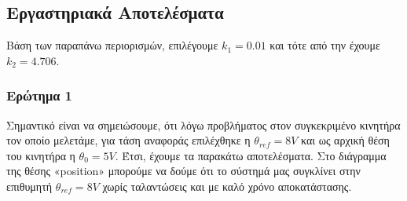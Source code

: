 \subsection{Εργαστηριακά Αποτελέσματα}
Βάση των παραπάνω περιορισμών, επιλέγουμε $k_1=0.01$ και τότε από την  έχουμε $k_2=4.706$.

\subsubsection{Ερώτημα 1}
Σημαντικό είναι να σημειώσουμε, ότι λόγω προβλήματος στον συγκεκριμένο κινητήρα τον οποίο μελετάμε, για τάση αναφοράς επιλέχθηκε η $θ_{ref} = 8V$ και ως αρχική θέση του κινητήρα η $θ_0=5V$. Έτσι, έχουμε τα παρακάτω αποτελέσματα. Στο διάγραμμα της θέσης «position» μπορούμε να δούμε ότι το σύστημά μας συγκλίνει στην επιθυμητή $θ_{ref} = 8V$ χωρίς ταλαντώσεις και με καλό χρόνο αποκατάστασης.

